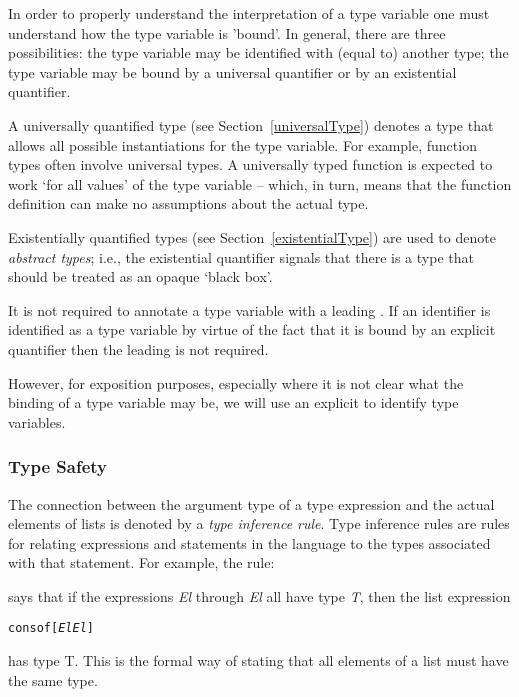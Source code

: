 \begin{aside}
In order to properly understand the interpretation of a type variable one must understand how the type variable is 'bound'. In general, there are three possibilities: the type variable may be identified with (equal to) another type; the type variable may be bound by a universal quantifier or by an existential quantifier.

A universally quantified type (see Section~\vref{universalType}) denotes a type that allows all possible instantiations for the type variable. For example, function types often involve universal types. A universally typed function is expected to work `for all values' of the type variable -- which, in turn, means that the function definition can make no assumptions about the actual type.

Existentially quantified types (see Section~\vref{existentialType}) are  used to denote \emph{abstract types}; i.e., the existential quantifier signals that there is a type that should be treated as an opaque `black box'.
\end{aside}

\begin{aside}
It is not required to annotate a type variable with a leading \q{\pcent{}}. If an identifier is identified as a type variable by virtue of the fact that it is bound by an explicit quantifier then the leading \q{\pcent{}} is not required.

However, for exposition purposes, especially where it is not clear what the binding of a type variable may be, we will use an explicit \q{\pcent{}} to identify type variables.
\end{aside}

\subsubsection{Type Safety}
The connection between the argument type of a  type expression and the actual elements of lists is denoted by a \emph{type inference rule}. Type inference rules are rules for relating expressions and statements in the language to the types associated with that statement. For example, the rule:
\begin{prooftree}
\end{prooftree}
says that if the expressions \emph{El} through \emph{El\subn} all have type \emph{T}, then the list expression
\begin{alltt}
cons of [\emph{El}\sequence{,}\emph{El\subn}]
\end{alltt}
has type  T. This is the formal way of stating that all elements of a list must have the same type.

